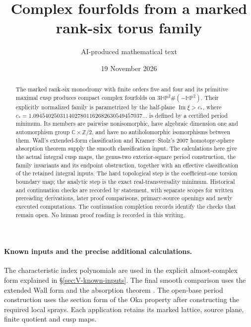 \documentclass[11pt,a4paper]{article}
\theoremstyle{definition}
\begin{document}
\title{Complex fourfolds from a marked rank-six torus family}
\author{AI-produced mathematical text}
\date{19 November 2026}
\maketitle

\begin{abstract}
The marked rank-six monodromy with finite orders five and four and its
primitive maximal cusp produces compact complex fourfolds on
$3\mathbb{HP}^2\#(-\mathbb{HP}^2)$. Their explicitly normalized family
is parametrized by the half-plane $\operatorname{Im}\xi>c_*$, where
$c_*=1.0945402503114027801162682630549457037\ldots$ is defined by
a certified period minimum. Its members are pairwise nonisomorphic,
have algebraic dimension one and automorphism group
$\mathbb C\times\mathbb Z/2$, and have no antiholomorphic
isomorphisms between them. Wall's extended-form classification and
Kramer--Stolz's 2007 homotopy-sphere absorption theorem supply the
smooth classification input. The calculations here give the actual
integral cusp maps, the genus-two exterior-square period construction,
the family invariants and its endpoint obstruction, together with an
effective classification of the retained integral inputs. The hard
topological step is the coefficient-one torsion boundary map; the
analytic step is the exact real-transversality minimum. Historical and continuation
checks are recorded by statement, with separate scopes for written
prereading derivations, later proof comparisons, primary-source
openings and newly executed computations. The continuation completion
records identify the checks that remain open. No human proof reading
is recorded in this writing.
\end{abstract}

\paragraph{Known inputs and the precise additional calculations.}
The characteristic index polynomials are used in the explicit
almost-complex form explained in \S\ref{sec:V-known-inputs}.
The final smooth comparison uses the extended Wall form
\cite[Definition 3.6 and Theorem 3.7(1), pp.~12--14]{IVVWallForm}
and the absorption theorem
\cite[Theorem A, p.~178]{IVVKramerStolz}.
The open-base period construction uses the section form of the Oka
property \cite[Definition 7.7, p.~22; Proposition 7.13(d), p.~24]{IVVOkaOneV5}
after constructing the required local sprays. Each application retains
its marked lattice, source plane, finite quotient and cusp maps.
\end{document}
